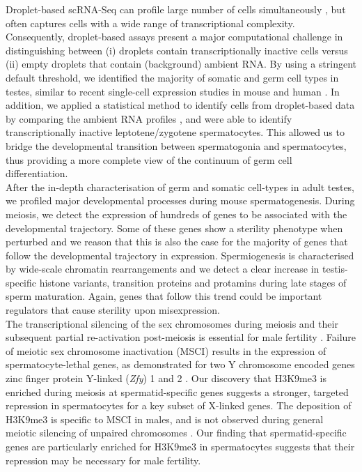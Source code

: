 Droplet-based scRNA-Seq can profile large number of cells simultaneously \citep{Klein2015, Macosko2015, Zheng2017}, but often captures cells with a wide range of transcriptional complexity. Consequently, droplet-based assays present a major computational challenge in distinguishing between (i) droplets contain transcriptionally inactive cells versus (ii) empty droplets that contain (background) ambient RNA. By using a stringent default threshold, we identified the majority of somatic and germ cell types in testes, similar to recent single-cell expression studies in mouse and human \citep{Lukassen2018, Xia2018, Chen2018}. In addition, we applied a statistical method to identify cells from droplet-based data by comparing the ambient RNA profiles \citep{Lun2018}, and were able to identify transcriptionally inactive leptotene/zygotene spermatocytes. This allowed us to bridge the developmental transition between spermatogonia and spermatocytes, thus providing a more complete view of the continuum of germ cell differentiation.\\

After the in-depth characterisation of germ and somatic cell-types in adult testes, we profiled major developmental processes during mouse spermatogenesis. During meiosis, we detect the expression of hundreds of genes to be associated with the developmental trajectory. Some of these genes show a sterility phenotype when perturbed and we reason that this is also the case for the majority of genes that follow the developmental trajectory in expression. Spermiogenesis is characterised by wide-scale chromatin rearrangements and we detect a clear increase in testis-specific histone variants, transition proteins and protamins during late stages of sperm maturation. Again, genes that follow this trend could be important regulators that cause sterility upon misexpression.   \\

The transcriptional silencing of the sex chromosomes during meiosis and their subsequent partial re-activation post-meiosis is essential for male fertility \citep{Mahadevaiah2008}. Failure of meiotic sex chromosome inactivation (MSCI) results in the expression of spermatocyte-lethal genes, as demonstrated for two Y chromosome encoded genes zinc finger protein Y-linked (\textit{Zfy}) 1 and 2 \citep{Royo2010}. Our discovery that H3K9me3 is enriched during meiosis at spermatid-specific genes suggests a stronger, targeted repression in spermatocytes for a key subset of X-linked genes. The deposition of H3K9me3 is specific to MSCI in males, and is not observed during general meiotic silencing of unpaired chromosomes \citep{Cloutier2016, Taketo2013, Turner2004a}. Our finding that spermatid-specific genes are particularly enriched for H3K9me3 in spermatocytes suggests that their repression may be necessary for male fertility. \\

